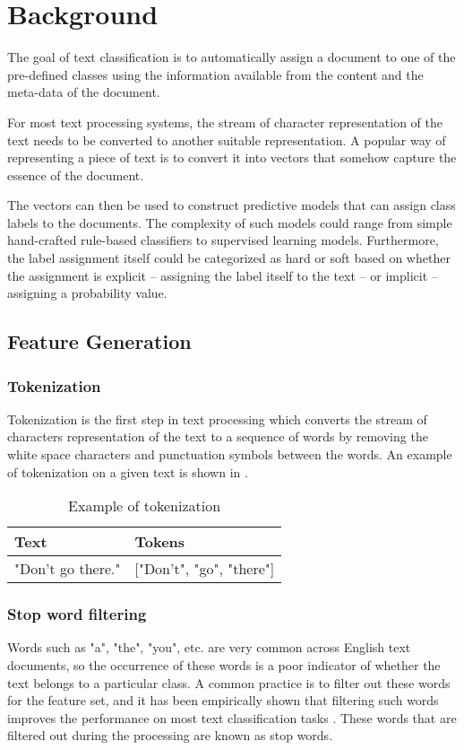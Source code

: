 \chapter{Background} \label{background}
The goal of text classification is to automatically assign a document to one of the pre-defined classes using the information available from the content and the meta-data of the document.

For most text processing systems, the stream of character representation of the text needs to be converted to another suitable representation. A popular way of representing a piece of text is to convert it into vectors that somehow capture the essence of the document. 

The vectors can then be used to construct predictive models that can assign class labels to the documents. The complexity of such models could range from simple hand-crafted rule-based classifiers to supervised learning models. Furthermore, the label assignment itself could be categorized as hard or soft based on whether the assignment is explicit -- assigning the label itself to the text -- or implicit -- assigning a probability value. 

\section{Feature Generation}
\subsection{Tokenization}
Tokenization is the first step in text processing which converts the stream of characters representation of the text to a sequence of words by removing the white space characters and punctuation symbols between the words. An example of tokenization on a given text is shown in .

\begin{table}[h]
\begin{center}
\caption{Example of tokenization}
\label{tbl:tokenization_example}
\begin{tabular}{p{6cm}p{6cm}}
\toprule 
Text&Tokens\\
\midrule 
"Don't go there."&["Don't", "go", "there"]\\
\bottomrule
\end{tabular}
\end{center}
\end{table}

\subsection{Stop word filtering}
Words such as "a", "the", "you", etc. are very common across English text documents, so the occurrence of these words is a poor indicator of whether the text belongs to a particular class. A common practice is to filter out these words for the feature set, and it has been empirically shown that filtering such words improves the performance on most text classification tasks \cite{silva2003importance}. These words that are filtered out during the processing are known as stop words. 

